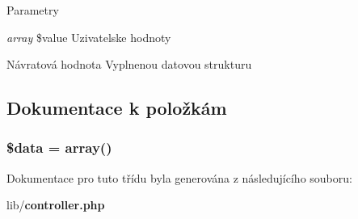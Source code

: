 \begin{DoxyParams}{Parametry}
\item[{\em array}]\$value Uzivatelske hodnoty \end{DoxyParams}
\begin{DoxyReturn}{Návratová hodnota}
Vyplnenou datovou strukturu 
\end{DoxyReturn}


\subsection{Dokumentace k položkám}
\subsubsection[{\$data}]{\setlength{\rightskip}{0pt plus 5cm}\$data = array()\hspace{0.3cm}{\ttfamily  [private]}}\label{d7/df8/classcallback__struct_a6efc15b5a2314dd4b5aaa556a375c6d6}


Dokumentace pro tuto třídu byla generována z následujícího souboru:\begin{DoxyCompactItemize}
\item 
lib/{\bf controller.php}\end{DoxyCompactItemize}
